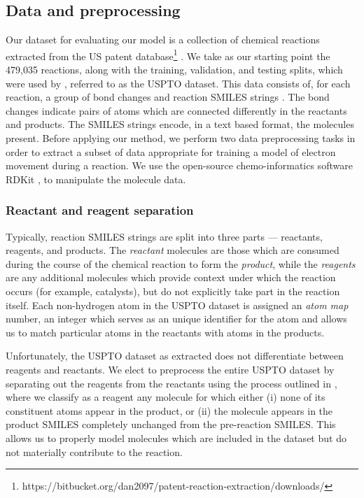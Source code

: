 
\subsection{Data and preprocessing}

Our dataset for evaluating our model is a collection of chemical reactions extracted from the US patent database\footnote{https://bitbucket.org/dan2097/patent-reaction-extraction/downloads/} \citep{lowe2012extraction}   .
We take as our starting point the 479,035 reactions, along with the training, validation, and testing splits, 
which were used by \citet{jin2017predicting}, referred to as the USPTO dataset.
This data consists of, for each reaction, a group of bond changes and reaction SMILES strings \citep{weininger1988smiles}.
The bond changes indicate pairs of atoms which are connected differently in the reactants and products.
The SMILES strings encode, in a text based format, the molecules present.
Before applying our method, we perform two data preprocessing tasks in order to extract a subset of data appropriate for training a
 model of electron movement during a reaction. We use the open-source chemo-informatics software RDKit
  \citep{rdkit}, to manipulate the molecule data.

\subsubsection{Reactant and reagent separation}

Typically, reaction SMILES strings are split into three parts --- reactants, reagents, and products.
The {\em reactant} molecules are those which are consumed during the course of the chemical reaction to form the {\em product}, 
while the {\em reagents} are any additional molecules which provide context under which the reaction occurs (for example, catalysts),
but do not explicitly take part in the reaction  itself.
Each non-hydrogen atom in the USPTO dataset is assigned an {\em atom map} number, an integer which serves as an unique identifier for the atom and allows us to match particular atoms in the reactants with atoms in the products.

Unfortunately, the USPTO dataset as extracted does not differentiate between reagents and reactants.
We elect to preprocess the entire USPTO dataset by separating out the reagents from the reactants using the process outlined in \citet{schwaller2017found}, where we classify as a reagent any molecule for which either 
(i) none of its constituent atoms appear in the product, or 
(ii) the molecule appears in the product SMILES completely unchanged from the pre-reaction SMILES.
This allows us to properly model molecules which are included in the dataset but do not materially contribute to the reaction.

